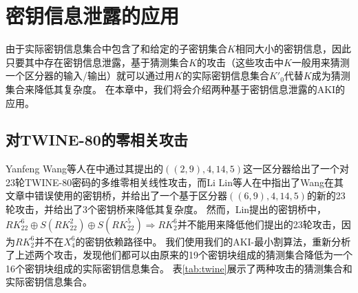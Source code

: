 
\chapter{密钥信息泄露的应用}
\label{chap:App}
由于实际密钥信息集合中包含了和给定的子密钥集合$K$相同大小的密钥信息，因此只要其中存在密钥信息泄露，基于猜测集合$K$的攻击（这些攻击中$K$一般用来猜测一个区分器的输入/输出）就可以通过用$K$的实际密钥信息集合$K'_0$代替$K$成为猜测集合来降低其复杂度。
在本章中，我们将会介绍两种基于密钥信息泄露的AKI的应用。

\section{对TWINE-80的零相关攻击}
Yanfeng Wang等人在中通过其提出的$((2,9),4,14,5)$这一区分器给出了一个对23轮TWINE-80密码的多维零相关线性攻击，而Li Lin等人在中指出了Wang在其文章中错误使用的密钥桥，并给出了一个基于区分器$((6,9),4,14,5)$的新的23轮攻击，并给出了3个密钥桥来降低其复杂度。
然而，Lin提出的密钥桥中，$RK^6_{22}\oplus S(RK^2_{22})\oplus S(RK^5_{22})\Rightarrow RK^6_2$并不能用来降低他们提出的23轮攻击，因为$RK^6_2$并不在$X^6_4$的密钥依赖路径中。
我们使用我们的AKI-最小割算法，重新分析了上述两个攻击，发现他们都可以由原来的19个密钥块组成的猜测集合降低为一个16个密钥块组成的实际密钥信息集合。
表\ref{tab:twine}展示了两种攻击的猜测集合和实际密钥信息集合。
